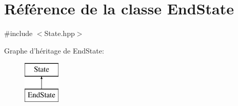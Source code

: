 \hypertarget{class_end_state}{\section{Référence de la classe End\-State}
\label{class_end_state}
}


{\ttfamily \#include $<$State.\-hpp$>$}

Graphe d'héritage de End\-State\-:\begin{figure}[H]
\begin{center}
\leavevmode
\includegraphics[height=2.000000cm]{class_end_state}
\end{center}
\end{figure}
